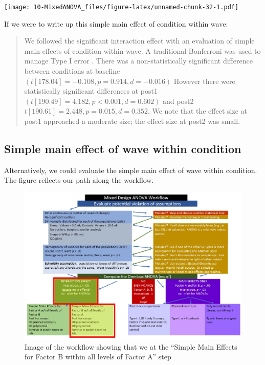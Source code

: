 \documentclass[
  11pt,
]{book}
\begin{document}
\texttt{[image: 10-MixedANOVA\_files/figure-latex/unnamed-chunk-32-1.pdf]}

If we were to write up this simple main effect of condition within wave:

\begin{quote}
We followed the significant interaction effect with an evaluation of simple main effects of condition within wave. A traditional Bonferroni was used to manage Type I error \citep{green_using_2017}. There was a non-statistically significant difference between conditions at baseline \((t[178.04] = -0.108, p = 0.914, d = -0.016)\) However there were statistically significant differences at post1 \((t[190.49] = 4.182, p < 0.001, d = 0.602)\) and post2 \(t[190.61] = 2.448, p = 0.015, d = 0.352\). We note that the effect size at post1 approached a moderate size; the effect size at post2 was small.
\end{quote}

\hypertarget{simple-main-effect-of-wave-within-condition}{%
\subsection{Simple main effect of wave within condition}\label{simple-main-effect-of-wave-within-condition}}

Alternatively, we could evaluate the simple main effect of wave within condition. The figure reflects our path along the workflow.

\begin{figure}
\centering
\includegraphics{images/mixed/mx_SimplemainB.jpg}
\caption{Image of the workflow showing that we at the ``Simple Main Effects for Factor B within all levels of Factor A'' step}
\end{figure}
\end{document}
